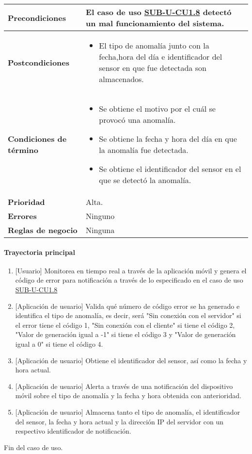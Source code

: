 \begin{longtable}{|J{5cm}|J{10.3cm}|}
	\textbf{Precondiciones} &
		El caso de uso \hyperref[SUB-U-CU1.8]{SUB-U-CU1.8} detectó un mal funcionamiento del sistema.\\ \hline
	\textbf{Postcondiciones} &
		\begin{itemize}
			\item El tipo de anomalía junto con la fecha,hora del día e identificador del sensor en que fue detectada son almacenados.
		\end{itemize}\\ \hline
	\textbf{Condiciones de término} & 
		\begin{itemize}
			\item Se obtiene el motivo por el cuál se provocó una anomalía.
			\item Se obtiene la fecha y hora del día en que la anomalía fue detectada.
			\item Se obtiene el identificador del sensor en el que se detectó la anomalía.
		\end{itemize} \\ \hline 
	\textbf{Prioridad} & 
		Alta. \\ \hline
	\textbf{Errores} & 
		Ninguno \\ \hline
	\textbf{Reglas de negocio} & 
		Ninguna \\ \hline

\end{longtable}

\paragraph{Trayectoria principal}
	\begin{enumerate}
		\item {[Usuario]} Monitorea en tiempo real a través de la aplicación móvil y genera el código de error para notificación a través de lo especificado en el caso de uso \hyperref[SUB-U-CU1.8]{SUB-U-CU1.8} 
		\item {[Aplicación de usuario]} Valida qué número de código error se ha generado e identifica el tipo de anomalía, es decir, será "Sin conexión con el servidor" si el error tiene el código 1, "Sin conexión con el cliente" si tiene el código 2, "Valor de generación igual a -1" si tiene el código 3 y "Valor de generación igual a 0" si tiene el código 4.
		\item {[Aplicación de usuario]} Obtiene el identificador del sensor, así como la fecha y hora actual.
		\item {[Aplicación de usuario]} Alerta a través de una notificación del dispositivo móvil sobre el tipo de anomalía y la fecha y hora obtenida con anterioridad.
		\item {[Aplicación de usuario]} Almacena tanto el tipo de anomalía, el identificador del sensor, la fecha y hora actual y la dirección IP del servidor con un respectivo identificador de notificación.
	\end{enumerate}
	Fin del caso de uso.
